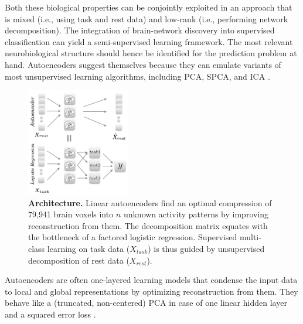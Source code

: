 \documentclass{article} %
\begin{document}
Both these biological properties can be conjointly exploited in an
approach that is
mixed (i.e., using task and rest data)
and 
low-rank (i.e., performing network decomposition).
%
The integration of brain-network discovery into
supervised classification can yield a semi-supervised learning
framework. The most relevant
neurobiological structure should hence be identified
for the prediction problem at hand.
%
Autoencoders suggest themselves because they can emulate
variants of most unsupervised learning algorithms,
including PCA, SPCA, and ICA \cite{hinton06}.
\begin{figure}
  \centering
    \includegraphics[width=0.40\textwidth]{figures/figure1.png}
  \vspace{-0.7cm}
  \caption {\textbf{Architecture.}
  Linear autoencoders find an optimal compression of 79,941 brain voxels
  into $n$ unknown activity patterns by improving reconstruction from them.
  The decomposition matrix equates with the bottleneck of
  a factored logistic regression.
  Supervised multi-class learning on task data ($X_{task}$)
  is thus guided by
  unsupervised decomposition of rest data ($X_{rest}$).
  }
\end{figure}
%
Autoencoders
are often one-layered learning models 
that condense the input data to
local and global 
representations
by optimizing reconstruction from them.
%
They behave like a (truncated, non-centered) PCA
in case of one linear hidden layer and a squared error loss
\cite{baldi1989neural}.
\end{document}

